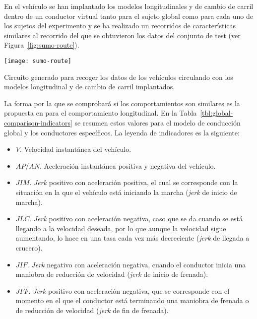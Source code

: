 En el vehículo se han implantado los modelos longitudinales y de cambio de carril dentro de un conductor virtual tanto para el sujeto global como para cada uno de los sujetos del experimento y se ha realizado un recorridos de características similares al recorrido del que se obtuvieron los datos del conjunto de test (ver Figura~\ref{fig:sumo-route}).

\begin{marginfigure}
	\centering
	\texttt{[image: sumo-route]}
	\caption[Circuito de prueba en el entorno virtual]{Circuito generado para recoger los datos de los vehículos circulando con los modelos longitudinal y de cambio de carril implantados.}
	\label{fig:sumo-route}
\end{marginfigure}

La forma por la que se comprobará si los comportamientos son similares es la propuesta en \cite{DiazAlvarez2014} para el comportamiento longitudinal. En la Tabla~\ref{tbl:global-comparison-indicators} se resumen estos valores para el modelo de conducción global y los conductores específicos. La leyenda de indicadores es la siguiente:

\begin{itemize}
	\item $V$. Velocidad instantánea del vehículo.
	\item $AP$/$AN$. Aceleración instantánea positiva y negativa del vehículo.
	\item $JIM$. \textit{Jerk} positivo con aceleración positiva, el cual se corresponde con la situación en la que el vehículo está iniciando la marcha (\textit{jerk} de inicio de marcha).
	\item $JLC$. \textit{Jerk} positivo con aceleración negativa, caso que se da cuando se está llegando a la velocidad deseada, por lo que aunque la velocidad sigue aumentando, lo hace en una tasa cada vez más decreciente (\textit{jerk} de llegada a crucero).
	\item $JIF$. \textit{Jerk} negativo con aceleración negativa, cuando el conductor inicia una maniobra de reducción de velocidad (\textit{jerk} de inicio de frenada).
	\item $JFF$. \textit{Jerk} positivo con aceleración negativa, que se corresponde con el momento en el que el conductor está terminando una maniobra de frenada o de reducción de velocidad (\textit{jerk} de fin de frenada).
\end{itemize}

